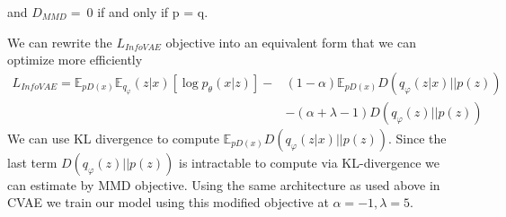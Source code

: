 \documentclass[12pt,a4paper]{article}
\begin{document}
and $D_{MMD}=\ 0$ if and only if p = q. \par
We can rewrite the $L_{InfoVAE}$ objective into an equivalent form that we can optimize more efficiently
\begin{equation}
    \begin{split}
        L_{InfoVAE} = \mathbb{E}_{pD(x)}\mathbb{E}_{q _\varphi}(z|x)[\log p_\theta(x|z)] - &(1 - \alpha )\mathbb{E}_{pD(x)}D(q_\varphi(z|x)\vert \vert p(z))\\& - (\alpha + \lambda - 1)D(q_\varphi(z)\vert \vert p(z))
    \end{split}
\end{equation}
We can use KL divergence to compute $\mathbb{E}_{pD(x)}D(q_\varphi(z|x)\vert \vert p(z))$. Since the last term $D(q_\varphi(z)\vert \vert p(z))$ is intractable to compute via KL-divergence we can estimate by MMD objective. Using the same architecture as used above in CVAE we train our model using this modified objective at $\alpha =-1, \lambda=5$.
\end{document}
